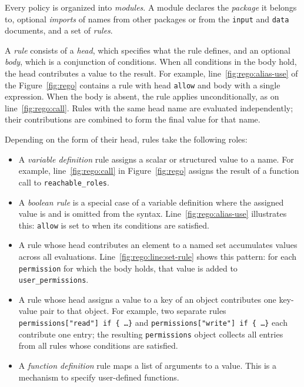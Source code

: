 Every \rego policy is organized into \emph{modules}.
A module declares the \emph{package} it belongs to, optional \emph{imports} of names from other packages or from the \texttt{input} and \texttt{data} documents, and a set of \emph{rules}.

A \emph{rule} consists of a \emph{head}, which specifies what the rule defines, and an optional \emph{body}, which is a conjunction of conditions.
When all conditions in the body hold, the head contributes a value to the result.
For example, line~\ref{fig:rego:alias-use} of the Figure~\ref{fig:rego} contains a rule with head \texttt{allow} and body with a single expression.
When the body is absent, the rule applies unconditionally, as on line~\ref{fig:rego:call}.
Rules with the same head name are evaluated independently; their contributions are combined to form the final value for that name.

Depending on the form of their head, rules take the following roles:
\begin{itemize}
  \item A \emph{variable definition} rule assigns a scalar or structured value to a name.
    For example, line~\ref{fig:rego:call} in Figure~\ref{fig:rego} assigns the result of a function call to \texttt{reachable\_roles}.
  \item A \emph{boolean rule} is a special case of a variable definition where the assigned value is \true and is omitted from the syntax.
    Line~\ref{fig:rego:alias-use} illustrates this: \texttt{allow} is set to \true when its conditions are satisfied.
  \item A rule whose head contributes an element to a named set accumulates values across all evaluations.
    Line~\ref{fig:rego:line:set-rule} shows this pattern: for each \texttt{permission} for which the body holds, that value is added to \texttt{user\_permissions}.
  \item A rule whose head assigns a value to a key of an object contributes one key-value pair to that object.
    For example, two separate rules \texttt{permissions["read"] if \{ \ldots \}} and \texttt{permissions["write"] if \{ \ldots \}} each contribute one entry; the resulting \texttt{permissions} object collects all entries from all rules whose conditions are satisfied.
  \item A \emph{function definition} rule maps a list of arguments to a value.
    This is a mechanism to specify user-defined functions.
\end{itemize}

